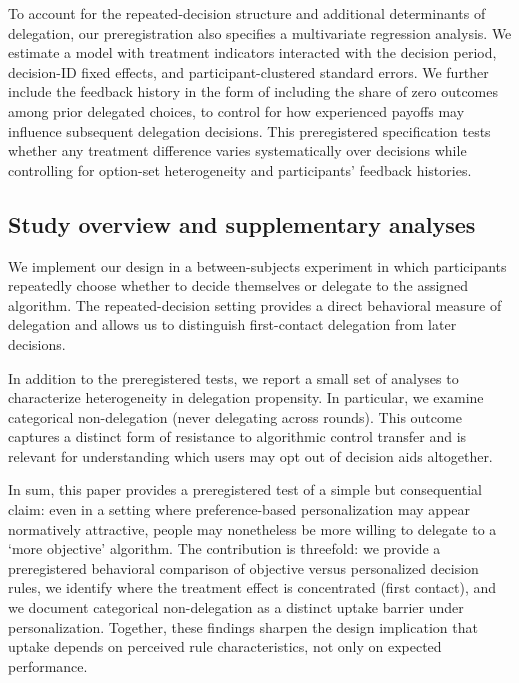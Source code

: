 \documentclass[a4paper, 12pt, fleqn]{article}
\theoremstyle{definition}
\begin{document}
To account for the repeated-decision structure and additional determinants of delegation, our preregistration also specifies a multivariate regression analysis. We estimate a model with treatment indicators interacted with the decision period, decision-ID fixed effects, and participant-clustered standard errors. We further include the feedback history in the form of including the share of zero outcomes among prior delegated choices, to control for how experienced payoffs may influence subsequent delegation decisions. This preregistered specification tests whether any treatment difference varies systematically over decisions while controlling for option-set heterogeneity and participants' feedback histories.

\subsection*{Study overview and supplementary analyses}
We implement our design in a between-subjects experiment in which participants repeatedly choose whether to decide themselves or delegate to the assigned algorithm. The repeated-decision setting provides a direct behavioral measure of delegation and allows us to distinguish first-contact delegation from later decisions.

In addition to the preregistered tests, we report a small set of analyses to characterize heterogeneity in delegation propensity. In particular, we examine categorical non-delegation (never delegating across rounds). This outcome captures a distinct form of resistance to algorithmic control transfer and is relevant for understanding which users may opt out of decision aids altogether.

In sum, this paper provides a preregistered test of a simple but consequential claim: even in a setting where preference-based personalization may appear normatively attractive, people may nonetheless be more willing to delegate to a `more objective' algorithm. The contribution is threefold: we provide a preregistered behavioral comparison of objective versus personalized decision rules, we identify where the treatment effect is concentrated (first contact), and we document categorical non-delegation as a distinct uptake barrier under personalization. Together, these findings sharpen the design implication that uptake depends on perceived rule characteristics, not only on expected performance.
\end{document}
